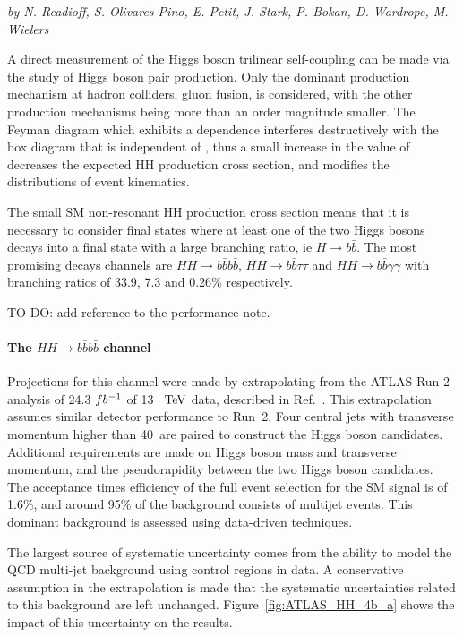 \begin{center}
\textit{by N. Readioff, S. Olivares Pino, E. Petit, J. Stark, P. Bokan, D. Wardrope, M. Wielers}
\end{center}

A direct measurement of the Higgs boson trilinear self-coupling \lHHH can be made via the study of Higgs boson pair production. Only the dominant production mechanism at hadron colliders, gluon fusion, is considered, with the other production mechanisms being more than an order magnitude smaller.
The Feyman diagram which exhibits a \lHHH dependence interferes destructively with the box diagram that is independent of \lHHH , thus a small increase in the value of \lHHH decreases the expected HH production cross section, and modifies the distributions of event kinematics.

The small SM non-resonant HH production cross section means that it is necessary to consider final states where at least one of the two Higgs bosons decays into a final state with a large branching ratio, ie $H \rightarrow b\bar{b}$. The most promising decays channels are $HH \rightarrow b\bar{b}b\bar{b}$, $HH \rightarrow b\bar{b}\tau\tau$ and $HH \rightarrow b\bar{b}\gamma\gamma$ with branching ratios of 33.9, 7.3 and 0.26\% respectively.

TO DO: add reference to the performance note.



%
\paragraph{The $HH \rightarrow b\bar{b}b\bar{b}$ channel}

Projections for this channel were made by extrapolating from the ATLAS Run 2 analysis of 24.3 $fb^{-1}$ of 13~$~\text{TeV}$ data, described in Ref.~\cite{ITKPixelTDR}. This extrapolation assumes similar detector performance to Run~2. Four central jets with transverse momentum higher than 40~\UGeV are paired to construct the Higgs boson candidates. Additional requirements are made on Higgs boson mass and transverse momentum, and the pseudorapidity between the two Higgs boson candidates.
The acceptance times efficiency of the full event selection for the SM signal is of 1.6\%, and around 95\% of the background consists of multijet events. This dominant background is assessed using data-driven techniques. 

The largest source of systematic uncertainty comes from the ability to model the QCD multi-jet background using control regions in data. A conservative assumption in the extrapolation is made that the systematic uncertainties related to this background are left unchanged. Figure~\ref{fig:ATLAS_HH_4b_a} shows the impact of this uncertainty on the results.


